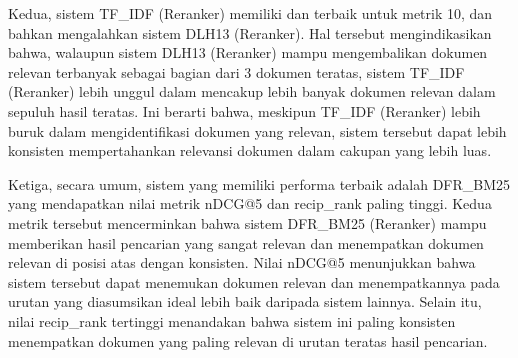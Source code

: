 Kedua, sistem TF\_IDF (Reranker) memiliki \precision{} dan \recall{} terbaik untuk metrik \cutoff{} 10, dan bahkan mengalahkan sistem DLH13 (Reranker). Hal tersebut mengindikasikan bahwa, walaupun sistem DLH13 (Reranker) mampu mengembalikan dokumen relevan terbanyak sebagai bagian dari 3 dokumen teratas, sistem TF\_IDF (Reranker) lebih unggul dalam mencakup lebih banyak dokumen relevan dalam sepuluh hasil teratas. Ini berarti bahwa, meskipun TF\_IDF (Reranker) lebih buruk dalam mengidentifikasi dokumen yang relevan, sistem tersebut dapat lebih konsisten mempertahankan relevansi dokumen dalam cakupan yang lebih luas.

Ketiga, secara umum, sistem yang memiliki performa terbaik adalah DFR\_BM25 yang mendapatkan nilai metrik nDCG@5 dan recip\_rank paling tinggi. Kedua metrik tersebut mencerminkan bahwa sistem DFR\_BM25 (Reranker) mampu memberikan hasil pencarian yang sangat relevan dan menempatkan dokumen relevan di posisi atas dengan konsisten. Nilai nDCG@5 menunjukkan bahwa sistem tersebut dapat menemukan dokumen relevan dan menempatkannya pada urutan yang diasumsikan ideal lebih baik daripada sistem lainnya. Selain itu, nilai recip\_rank tertinggi menandakan bahwa sistem ini paling konsisten menempatkan dokumen yang paling relevan di urutan teratas hasil pencarian.
